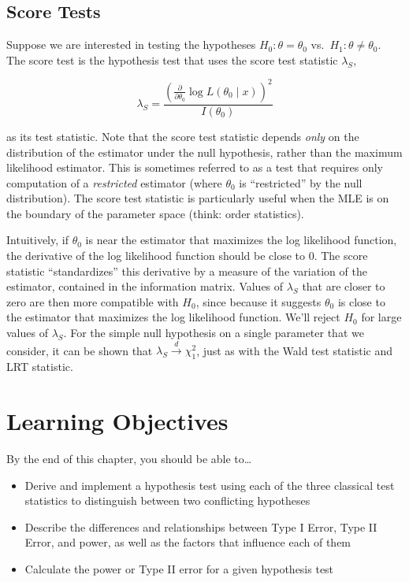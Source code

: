 \documentclass[
  letterpaper,
  DIV=11,
  numbers=noendperiod]{scrreprt}
\providecommand{\tightlist}{%
  \setlength{\itemsep}{0pt}\setlength{\parskip}{0pt}}\usepackage{longtable,booktabs,array}
\begin{document}
\subsection*{Score Tests}\label{score-tests}

Suppose we are interested in testing the hypotheses
\(H_0: \theta = \theta_0\) vs.~\(H_1: \theta \neq \theta_0\). The score
test is the hypothesis test that uses the score test statistic
\(\lambda_S\),

\[
\lambda_S = \frac{\left( \frac{\partial}{\partial \theta_0} \log L(\theta_0 \mid x) \right)^2}{I(\theta_0)}
\]

as its test statistic. Note that the score test statistic depends
\emph{only} on the distribution of the estimator under the null
hypothesis, rather than the maximum likelihood estimator. This is
sometimes referred to as a test that requires only computation of a
\emph{restricted} estimator (where \(\theta_0\) is ``restricted'' by the
null distribution). The score test statistic is particularly useful when
the MLE is on the boundary of the parameter space (think: order
statistics).

Intuitively, if \(\theta_0\) is near the estimator that maximizes the
log likelihood function, the derivative of the log likelihood function
should be close to \(0\). The score statistic ``standardizes'' this
derivative by a measure of the variation of the estimator, contained in
the information matrix. Values of \(\lambda_S\) that are closer to zero
are then more compatible with \(H_0\), since because it suggests
\(\theta_0\) is close to the estimator that maximizes the log likelihood
function. We'll reject \(H_0\) for large values of \(\lambda_S\). For
the simple null hypothesis on a single parameter that we consider, it
can be shown that \(\lambda_{S} \overset{d}{\to} \chi^2_1\), just as
with the Wald test statistic and LRT statistic.

\section{Learning Objectives}\label{learning-objectives-6}

By the end of this chapter, you should be able to\ldots{}

\begin{itemize}
\tightlist
\item
  Derive and implement a hypothesis test using each of the three
  classical test statistics to distinguish between two conflicting
  hypotheses
\item
  Describe the differences and relationships between Type I Error, Type
  II Error, and power, as well as the factors that influence each of
  them
\item
  Calculate the power or Type II error for a given hypothesis test
\end{itemize}
\end{document}

